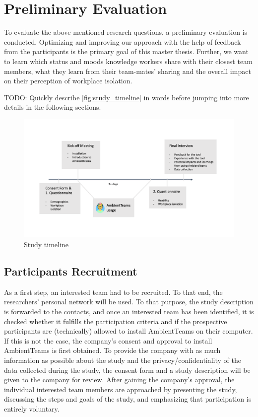 \chapter{Preliminary Evaluation}
To evaluate the above mentioned research questions, a preliminary evaluation is conducted. Optimizing and improving our approach with the help of feedback from the participants is the primary goal of this master thesis. Further, we want to learn which status and moods knowledge workers share with their closest team members, what they learn from their team-mates' sharing and the overall impact on their perception of workplace isolation.

TODO: Quickly describe \autoref{fig:study_timeline} in words before jumping into more details in the following sections.

\begin{figure}[h]
    \centering
    \includegraphics[width=.8\linewidth]{./images/Study_Timeline.png}
    \caption{Study timeline}
    \label{fig:study_timeline}
\end{figure}

\section{Participants Recruitment}
\label{section:recruitment}
As a first step, an interested team had to be recruited. To that end, the researchers' personal network will be used. To that purpose, the study description is forwarded to the contacts, and once an interested team has been identified, it is checked whether it fulfills the participation criteria and if the prospective participants are (technically) allowed to install AmbientTeams on their computer. If this is not the case, the company's consent and approval to install AmbientTeams is first obtained. To provide the company with as much information as possible about the study and the privacy/confidentiality of the data collected during the study, the consent form and a study description will be given to the company for review. After gaining the company's approval, the individual interested team members are approached by presenting the study, discussing the steps and goals of the study, and emphasizing that participation is entirely voluntary.


